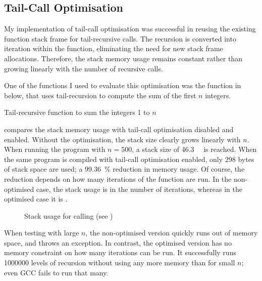 \documentclass[00-main.tex]{subfiles}
\begin{document}
\subsection{Tail-Call Optimisation}

My implementation of tail-call optimisation was successful in reusing the existing function stack frame for tail-recursive calls. The recursion is converted into iteration within the function, eliminating the need for new stack frame allocations.
Therefore, the stack memory usage remains constant rather than growing linearly with the number of recursive calls.

One of the functions I used to evaluate this optimisation was the function in  below, that uses tail-recursion to compute the sum of the first $n$ integers.

\begin{listing}[t]
  \caption{Tail-recursive function to sum the integers 1 to $n$}
  \label{lst:tail-recursive sum}
\end{listing}


 compares the stack memory usage with tail-call optimisation disabled and enabled.
Without the optimisation, the stack size clearly grows linearly with $n$.
When running the program with $n=500$, a stack size of \SI{46.3}{\kilo\byte} is reached.
When the same program is compiled with tail-call optimisation enabled, only 298 bytes of stack space are used; a \SI{99.36}{\percent} reduction in memory usage.
Of course, the reduction depends on how many iterations of the function are run.
In the non-optimised case, the stack usage is  in the number of iterations, whereas in the optimised case it is .

\begin{figure}[t]
  \centering
  \caption{Stack usage for calling  (see )}
  \label{fig:tail-call optimisation stack use} %
\end{figure}

When testing with large $n$, the non-optimised version quickly runs out of memory space, and throws an exception.
In contrast, the optimised version has no memory constraint on how many iterations can be run.
It successfully runs \num{1000000} levels of recursion without using any more memory than for small $n$; even GCC fails to run that many.
\end{document}
